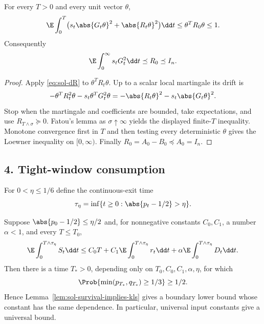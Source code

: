 \documentclass[../main.tex]{subfiles}
\begin{document}
\begin{corollary}[= Corollary~\ref{cor:per-direction}]
\label{cor:sol-per-direction}
For every $T>0$ and every unit vector $\theta$,
\[
 \E\int_0^T\bigl(s_t\abs{G_t\theta}^2+\abs{R_t\theta}^2\bigr)\dd t
 \le\theta^TR_0\theta\le1.
\]
Consequently
\[
 \E\int_0^\infty s_tG_t^2\dd t\preceq R_0\preceq I_n.
\]
\end{corollary}

\begin{proof}
Apply \eqref{eq:sol-dR} to $\theta^TR_t\theta$.  Up to a scalar local martingale its drift is
\[
 -\theta^TR_t^2\theta-s_t\theta^TG_t^2\theta
 =-\abs{R_t\theta}^2-s_t\abs{G_t\theta}^2.
\]
Stop when the martingale and coefficients are bounded, take expectations, and use
$R_{T\wedge\sigma}\succeq0$.  Fatou's lemma as $\sigma\uparrow\infty$ yields the displayed
finite-$T$ inequality.  Monotone convergence first in $T$ and then testing every deterministic
$\theta$ gives the Loewner inequality on $[0,\infty)$.  Finally
$R_0=A_0-B_0\preceq A_0=I_n$.
\end{proof}

\subsection*{4. Tight-window consumption}

For $0<\eta\le1/6$ define the continuous-exit time
\[
 \tau_\eta=\inf\{t\ge0:\abs{p_t-1/2}>\eta\}.
\]

\begin{corollary}[= Corollary~\ref{cor:tight-window-consumption}]
\label{cor:sol-tight-window-consumption}
Suppose $\abs{p_0-1/2}\le\eta/2$ and, for nonnegative constants $C_0,C_1$, a number
$\alpha<1$, and every $T\le T_0$,
\begin{equation}\label{eq:sol-tight-carleson}
 \E\int_0^{T\wedge\tau_\eta}S_t\dd t
 \le C_0T+C_1\E\int_0^{T\wedge\tau_\eta}r_t\dd t
 +\alpha\E\int_0^{T\wedge\tau_\eta}D_t\dd t.
\end{equation}
Then there is a time $T_*>0$, depending only on
$T_0,C_0,C_1,\alpha,\eta$, for which
\[
 \Prob\{\min(p_{T_*},q_{T_*})\ge1/3\}\ge1/2.
\]
Hence Lemma~\ref{lem:sol-survival-implies-kls} gives a boundary lower bound whose constant has
the same dependence.  In particular, universal input constants give a universal bound.
\end{corollary}
\end{document}
